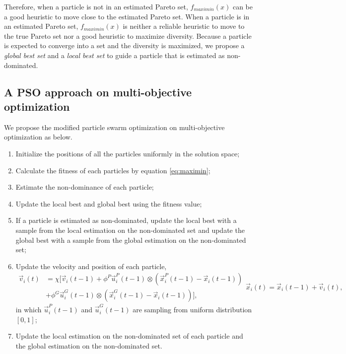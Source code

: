 \documentclass[12pt]{article}
\begin{document}
Therefore, when a particle is not in an estimated Pareto set, $ f_{maximin} (x) $ can be a good heuristic to move close to the estimated Pareto set.
When a particle is in an estimated Pareto set, $ f_{maximin} (x) $ is neither a reliable heuristic to move to the true Pareto set nor a good heuristic to maximize diversity.
Because a particle is expected to converge into a set and the diversity is maximized, we propose a \emph{global best set} and a \emph{local best set} to guide a particle that is estimated as non-dominated. 

\subsection{A PSO approach on multi-objective optimization}

We propose the modified particle swarm optimization on multi-objective optimization as below.
\begin{enumerate}
\item Initialize the positions of all the particles uniformly in the solution space;
\item Calculate the fitness of each particles by equation \eqref{eq:maximin};
\item Estimate the non-dominance of each particle;
\item Update the local best and global best using the fitness value;
\item If a particle is estimated as non-dominated, update the local best with a sample from the local estimation on the non-dominated set and update the global best with a sample from the global estimation on the non-dominated set;
\item Update the velocity and position of each particle, 
\begin{subequations}
\label{eq:pso_alg}
\begin{equation}
\label{eq:up_vel}
\begin{aligned}
\vec{v}_{i}(t)  & = \chi [ \vec{v}_{i}(t-1) 
 + \phi^{P} \vec{u}^{P}_{i}(t-1) \otimes (\vec{x}^{P}_{i}(t-1) - \vec{x}_{i}(t-1)) \\
& + \phi^{G} \vec{u}^{G}_{i}(t-1) \otimes (\vec{x}^{G}_{i}(t-1) - \vec{x}_{i}(t-1)) ],
\end{aligned}
\end{equation}
\begin{equation}
\label{eq:up_pos}
\vec{x}_{i}(t) = \vec{x}_{i}(t-1) + \vec{v}_{i}(t),
\end{equation}
\end{subequations}
in which $ \vec{u}^{P}_{i}(t-1) $ and $ \vec{u}^{G}_{i}(t-1) $ are sampling from uniform distribution $ [0, 1] $;
\item Update the local estimation on the non-dominated set of each particle and the global estimation on the non-dominated set.
\end{enumerate}
\end{document}
